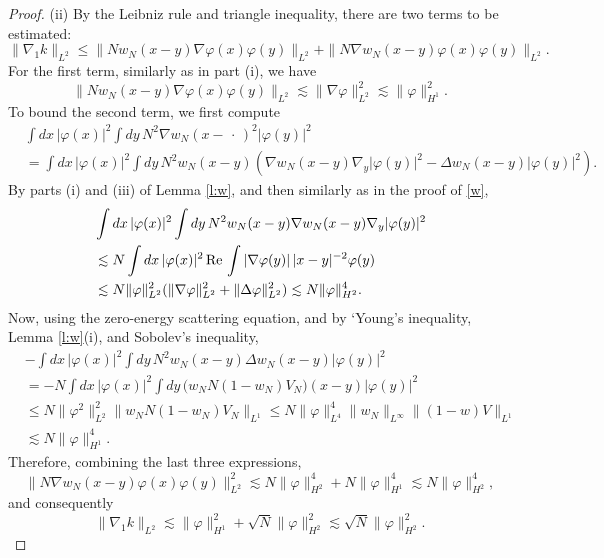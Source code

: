 \documentclass[a4paper,11pt]{article}
\renewcommand{\Re}{\,{\rm Re}\,}
\begin{document}
\begin{proof}
  (ii) By the Leibniz rule and triangle inequality, there are two terms to be
  estimated:
  \begin{displaymath}
    \| \nabla_1 k \|_{L^2} \le \| N w_N(x-y) \nabla \varphi(x) \varphi(y)
    \|_{L^2} + \| N \nabla w_N(x-y) \varphi(x) \varphi(y) \|_{L^2}.
  \end{displaymath}
  For the first term, similarly as in part (i), we have
  \begin{displaymath}
    \| N w_N(x-y) \nabla \varphi(x) \varphi(y) \|_{L^2} \apprle \| \nabla
    \varphi \|_{L^2}^2 \apprle \| \varphi \|_{H^1}^2.
  \end{displaymath}
  To bound the second term, we first compute
  \begin{align*}
    & \int dx \, |\varphi(x)|^2 \int dy \, N^2 \nabla w_N(x-\,\cdot\,)^2
    |\varphi(y)|^2 \\
    & = \int dx \, |\varphi(x)|^2 \int dy \, N^2 w_N(x-y) ( \nabla w_N(x-y)
    \nabla_y |\varphi(y)|^2 - \Delta w_N(x-y) |\varphi(y)|^2 ).
  \end{align*}
  By parts (i) and (iii) of Lemma \ref{l:w}, and then similarly as in the
  proof of \eqref{w},
  \begin{align*}
    & \int dx \, |\varphi(x)|^2 \int dy \, N^2 w_N(x-y) \nabla w_N(x-y)
    \nabla_y |\varphi(y)|^2 \\
    & \apprle N \int dx \, |\varphi(x)|^2 \Re \int |\nabla \varphi(y)| \,
    |x-y|^{-2} \varphi(y) \\
    & \apprle N \| \varphi \|_{L^2}^2 ( \| \nabla \varphi \|_{L^2}^2 + \|
    \Delta \varphi \|_{L^2}^2) \apprle N \| \varphi \|_{H^2}^4.
  \end{align*}
  Now, using the zero-energy scattering equation, and by `Young's inequality,
  Lemma \ref{l:w}(i), and Sobolev's inequality, \begin{align*}
    & - \int dx \, |\varphi(x)|^2 \int dy \, N^2 w_N(x-y) \Delta w_N(x-y)
    |\varphi(y)|^2 \\
    & = - N \int dx \, |\varphi(x)|^2 \int dy \, \big( w_N N (1-w_N) V_N
    \big)(x-y) |\varphi(y)|^2 \\
    & \le N \| \varphi^2 \|_{L^2}^2 \| w_N N (1-w_N) V_N \|_{L^1} \le N \|
    \varphi \|_{L^4}^4 \| w_N \|_{L^\infty} \| (1-w)V \|_{L^1} \\
    & \apprle N \| \varphi \|_{H^1}^4.
  \end{align*}
  Therefore, combining the last three expressions,
  \begin{displaymath}
    \| N \nabla w_N(x-y) \varphi(x) \varphi(y) \|_{L^2}^2 \apprle N \| \varphi
    \|_{H^2}^4 + N \| \varphi \|_{H^1}^4 \apprle N \| \varphi \|_{H^2}^4,
  \end{displaymath}
  and consequently
  \begin{displaymath}
    \| \nabla_1 k \|_{L^2} \apprle \| \varphi \|_{H^1}^2 + \sqrt{N} \| \varphi
    \|_{H^2}^2 \apprle \sqrt{N} \| \varphi \|_{H^2}^2.
  \end{displaymath}



\end{proof}
\end{document}
